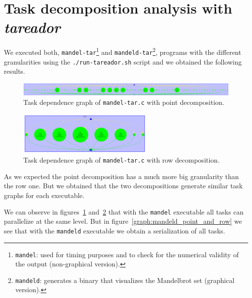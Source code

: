 \pagebreak
\section{Task decomposition analysis with \emph{tareador}}%
\label{sec:tareador}

We executed both, \texttt{mandel-tar}\footnote{\texttt{mandel}: used for timing purposes and to check for the numerical validity of the output (non-graphical version).} and \texttt{mandeld-tar}\footnote{\texttt{mandeld}: generates a binary that visualizes the Mandelbrot set (graphical version).}, programs with the different granularities using the \texttt{./run-tareador.sh} script and we obtained the following results.

\begin{figure}[H]
\centering
\includegraphics[width=\textwidth]{plots/dependency_graph_mandel_point.png}
\caption{Task dependence graph of \texttt{mandel-tar.c} with point decomposition.}
\label{graph:mandel_point}
\end{figure}

\begin{figure}[H]
\centering
\includegraphics[width=0.6\textwidth]{plots/dependency_graph_mandel_row.pdf}
\caption{Task dependence graph of \texttt{mandel-tar.c} with row decomposition.}
\label{graph:mandel_row}
\end{figure}

As we expected the point decomposition has a much more big granularity than the row one. But we obtained that the two decompositions generate similar task graphs for each executable.

We can observe in figures~\ref{graph:mandel_point} and~\ref{graph:mandel_row} that with the \texttt{mandel} executable all tasks can parallelize at the same level. But in figure~\ref{graph:mandeld_point_and_row} we see that with the \texttt{mandeld} executable we obtain a serialization of all tasks.

